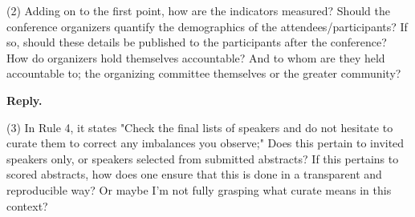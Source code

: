 \documentclass{article}
\newenvironment{Reply}{\noindent\color{BlueViolet}\textbf{Reply.}}{\vspace{1em}}
\begin{document}
(2) Adding on to the first point, how are the indicators measured? Should the conference organizers quantify the demographics of the attendees/participants? If so, should these details be published to the participants after the conference? How do organizers hold themselves accountable? And to whom are they held accountable to; the organizing committee themselves or the greater community?

\begin{Reply}

\end{Reply}
(3) In Rule 4, it states "Check the final lists of speakers and do not hesitate to curate them to correct any imbalances you observe;" Does this pertain to invited speakers only, or speakers selected from submitted abstracts? If this pertains to scored abstracts, how does one ensure that this is done in a transparent and reproducible way? Or maybe I'm not fully grasping what curate means in this context?
\end{document}
